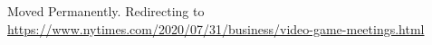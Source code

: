 Moved Permanently. Redirecting to
\href{https://www.nytimes.com/2020/07/31/business/video-game-meetings.html}{https://www.nytimes.com/2020/07/31/business/video-game-meetings.html}
